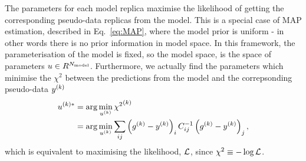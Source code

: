 The parameters for each model replica maximise the
likelihood of getting the corresponding pseudo-data replicas from the
model. This is a special
case of MAP estimation, described in Eq.~\eqref{eq:MAP}, where the model prior
is uniform - in other words there
is no prior information in model space. In this framework, the parameterisation
of the model is fixed, so the model space, is the space of parameters
$u \in R^{N_{\rm model}}$. Furthermore, we actually find the parameters which
minimise the $\chi^2$ between the
predictions from the model and
the correpsonding pseudo-data $y^{(k)}$
\begin{equation}
    \begin{split}
        u^{(k) *} &= \arg\min_{u^{(k)}} {\chi^2}^{(k)} \\
        &= \arg\min_{u^{(k)}} \sum_{ij} \left( g^{(k)} - y^{(k)} \right)_i C^{-1}_{ij} \left( g^{(k)} - y^{(k)} \right)_j,
    \end{split}
\end{equation}
which is equivalent to maximising the likelihood, $\mathcal{L}$, since
$\chi^2 \equiv -\log{\mathcal{L}}$.

